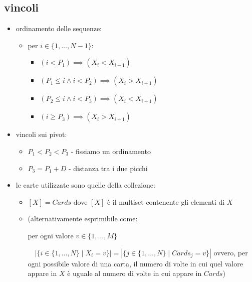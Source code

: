 \documentclass[12pt]{article}
\begin{document}
    \subsection*{vincoli}
        \begin{itemize}
\item ordinamento delle sequenze:
    \begin{itemize}
        \item per $i \in \{1, \dots, N-1\}:$
        \begin{itemize}
            \item $(i < P_1) \implies (X_i < X_{i+1})$
            \item $(P_1 \leq i \land i < P_2) \implies (X_i > X_{i+1})$
            \item $(P_2 \leq i \land i < P_3) \implies (X_i < X_{i+1})$
            \item $(i \geq P_3) \implies (X_i > X_{i+1})$
        \end{itemize}
    \end{itemize}



                \item vincoli sui pivot:
            \begin{itemize}
            \item $P_1 < P_2 < P_3$ - fissiamo un ordinamento
                
            \item $P_3 = P_1 + D$ - distanza tra i due picchi
            \end{itemize}

        \item le carte utilizzate sono quelle della collezione:
            \begin{itemize}
                \item $[X] = Cards$ 
                    \subitem dove $[X]$ è il multiset contenente gli elementi di $X$
                \item (alternativamente esprimibile come:

                    \subitem per ogni valore $v \in \{1, \dots, M\}$

                    $\quad |\{i \in \{1, \dots, N\} \mid X_i = v\}| = |\{j \in \{1, \dots, N\} \mid Cards_j = v\}|$
                    \subitem ovvero, per ogni possibile valore di una carta, il numero di volte in cui quel valore appare in $X$ è uguale al numero di volte in cui appare in $Cards$)
            \end{itemize}
        \end{itemize}
\end{document}
